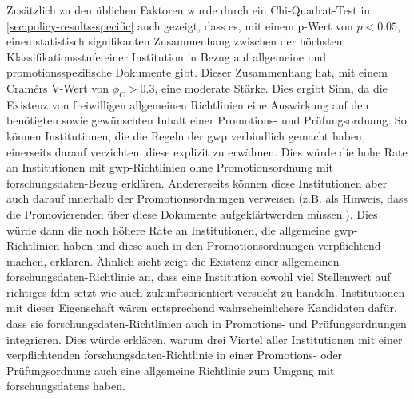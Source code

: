 Zusätzlich zu den üblichen Faktoren wurde durch ein Chi-Quadrat-Test in \cref{sec:policy-results-specific} auch gezeigt, dass es, mit einem p-Wert von $p<\num{0,05}$, einen statistisch signifikanten Zusammenhang zwischen der höchsten Klassifikationsstufe einer Institution in Bezug auf allgemeine und promotionsspezifische Dokumente gibt.
Dieser Zusammenhang hat, mit einem Cramérs V-Wert von $\phi_C>\num{0.3}$, eine moderate Stärke.
Dies ergibt Sinn, da die Existenz von freiwilligen allgemeinen Richtlinien eine Auswirkung auf den benötigten sowie gewünschten Inhalt einer Promotions- und Prüfungsordnung.
So können Institutionen, die die Regeln der \gls{gwp} verbindlich gemacht haben, einerseits darauf verzichten, diese explizit zu erwähnen.
Dies würde die hohe Rate an Institutionen mit \gls{gwp}-Richtlinien ohne Promotionsordnung mit \gls{forschungsdaten}-Bezug erklären.
Andererseits können diese Institutionen aber auch darauf innerhalb der Promotionsordnungen verweisen (z.B. als Hinweis, dass die Promovierenden über diese Dokumente aufgeklärtwerden müssen.).
Dies würde dann die noch höhere Rate an Institutionen, die allgemeine \gls{gwp}-Richtlinien haben und diese auch in den Promotionsordnungen verpflichtend machen, erklären.
Ähnlich sieht zeigt die Existenz einer allgemeinen \gls{forschungsdaten}-Richtlinie an, dass eine Institution sowohl viel Stellenwert auf richtiges \gls{fdm} setzt wie auch zukunftsorientiert versucht zu handeln.
Institutionen mit dieser Eigenschaft wären entsprechend wahrscheinlichere Kandidaten dafür, dass sie \gls{forschungsdaten}-Richtlinien auch in Promotions- und Prüfungsordnungen integrieren.
Dies würde erklären, warum drei Viertel aller Institutionen mit einer verpflichtenden \gls{forschungsdaten}-Richtlinie in einer Promotions- oder Prüfungsordnung auch eine allgemeine Richtlinie zum Umgang mit \glspl{forschungsdaten} haben.